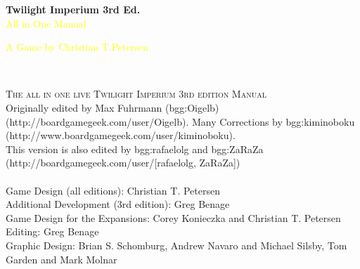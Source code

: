 \documentclass[11pt,fleqn]{book} %
\begin{document}

\begingroup
\thispagestyle{empty}
\centering
\vspace*{10cm}
\par\normalfont\fontsize{1}{1}\sffamily\selectfont
\textbf{Twilight Imperium 3rd Ed.}\\
{\LARGE\textcolor{yellow}{All in One Manual}}\par %
\vspace*{1cm}
{\Huge\textcolor{yellow}{ A Game by Christian T.Petersen}}\par %
\endgroup

\newpage
~\vfill
\thispagestyle{empty}


\noindent \textsc{The all in one live Twilight Imperium 3rd edition Manual}\\




\noindent Originally edited by Max Fuhrmann (bgg:Oigelb) (http://boardgamegeek.com/user/Oigelb).
Many Corrections by bgg:kiminoboku (http://www.boardgamegeek.com/user/kiminoboku).\\ 
This version is also edited by bgg:rafaelolg and bgg:ZaRaZa (http://boardgamegeek.com/user/[rafaelolg, ZaRaZa])\\
\\

\noindent Game Design (all editions): Christian T. Petersen\\
Additional Development (3rd edition): Greg Benage\\
Game Design for the Expansions: Corey Konieczka and Christian T. Petersen\\
Editing: Greg Benage\\
Graphic Design: Brian S. Schomburg, Andrew Navaro and Michael Silsby, Tom Garden and Mark Molnar\\
\end{document}
